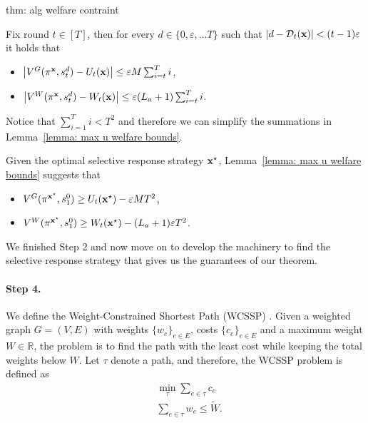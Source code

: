 \begin{proofof}{thm: alg welfare contraint}
\begin{lemma} \label{lemma: max u welfare bounds}
Fix round $t \in [T]$, then for every $d \in \{0, \varepsilon, \ldots T\}$ such that $\left|d - \mathcal{D}_t({\bf{x}}) \right| < (t-1)\varepsilon$ it holds that

\begin{itemize}
\item $\left| V^G(\pi^{{\bf{x}}}, s_t^d) - U_t({\bf{x}}) \right| \leq \varepsilon M \sum_{i = t}^T i$,
\item $\left| V^W(\pi^{{\bf{x}}}, s_t^d) - W_t({\bf{x}}) \right| \leq \varepsilon (L_a+1) \sum_{i = t}^T i$.
\end{itemize}
\end{lemma}

Notice that $\sum_{i = 1}^T i < T^2$ and therefore we can simplify the summations in Lemma~\ref{lemma: max u welfare bounds}.

Given the optimal selective response strategy ${\bf{x}}^\star$, Lemma~\ref{lemma: max u welfare bounds} suggests that

\begin{itemize}
\item $V^G(\pi^{{\bf{x}}^\star}, s_1^0) \geq U_t({\bf{x}}^\star) -  \varepsilon M T^2$,
\item $V^W(\pi^{{\bf{x}}^\star}, s_1^0) \geq W_t({\bf{x}}^\star) - (L_a+1) \varepsilon T^2$.
\end{itemize}

We finished Step 2 and now move on to develop the machinery to find the selective response strategy that gives us the guarantees of our theorem.






\paragraph{Step 4.} We define the Weight-Constrained Shortest Path (WCSSP) \cite{guide_theory_np_completeness}. Given a weighted graph $G=(V, E)$ with weights $\{ w_e\}_{e \in E}$, costs $\{ c_e \}_{e \in E}$ and a maximum weight $W \in \mathbb{R}$, the problem is to find the path with the least cost while keeping the total weights below $W$. Let $\tau$ denote a path, and therefore, the WCSSP problem is defined as
\begin{align}
&\min_{\tau} \sum_{e \in \tau} c_e \tag{P4} \label{eq: wcssp} \\
& \nonumber \sum_{e \in \tau} w_e \leq \tilde{W}.
\end{align}


\end{proofof}

